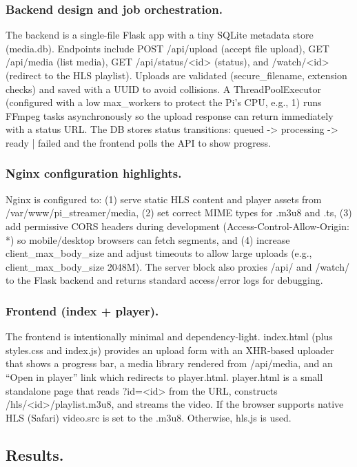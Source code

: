 \documentclass[11pt]{article}
\begin{document}
\subsubsection{Backend design and job orchestration.}
The backend is a single-file Flask app with a tiny SQLite metadata store (media.db). Endpoints include POST /api/upload (accept file upload), GET /api/media (list media), GET /api/status/<id> (status), and /watch/<id> (redirect to the HLS playlist). Uploads are validated (secure\_filename, extension checks) and saved with a UUID to avoid collisions. A ThreadPoolExecutor (configured with a low max\_workers to protect the Pi’s CPU, e.g., 1) runs FFmpeg tasks asynchronously so the upload response can return immediately with a status URL. The DB stores status transitions: queued -> processing -> ready | failed and the frontend polls the API to show progress.

\subsubsection{Nginx configuration highlights.}
Nginx\cite{nginx_static} is configured to: (1) serve static HLS content and player assets from /var/www/pi\_streamer/media, (2) set correct MIME types for .m3u8 and .ts, (3) add permissive CORS headers during development (Access-Control-Allow-Origin: *) so mobile/desktop browsers can fetch segments, and (4) increase client\_max\_body\_size and adjust timeouts to allow large uploads (e.g., client\_max\_body\_size 2048M). The server block also proxies /api/ and /watch/ to the Flask backend and returns standard access/error logs for debugging.

\subsubsection{Frontend (index + player).}
The frontend is intentionally minimal and dependency-light. index.html (plus styles.css and index.js) provides an upload form with an XHR-based uploader that shows a progress bar, a media library rendered from /api/media, and an “Open in player” link which redirects to player.html. player.html is a small standalone page that reads ?id=<id> from the URL, constructs /hls/<id>/playlist.m3u8, and streams the video. If the browser supports native HLS (Safari) video.src is set to the .m3u8. Otherwise, hls.js\cite{hls-js} is used.

\subsection{Results.}
\end{document}
